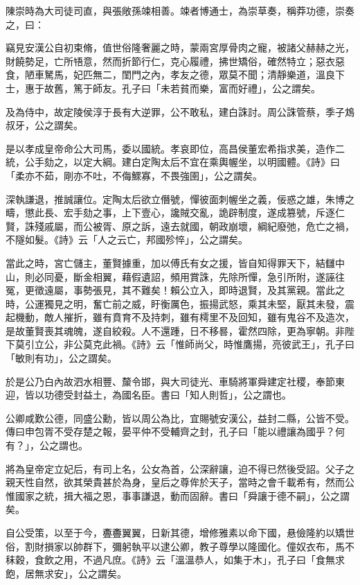\begin{pinyinscope}
陳崇時為大司徒司直，與張敞孫竦相善。竦者博通士，為崇草奏，稱莽功德，崇奏之，曰：

竊見安漢公自初束脩，值世俗隆奢麗之時，蒙兩宮厚骨肉之寵，被諸父赫赫之光，財饒勢足，亡所啎意，然而折節行仁，克心履禮，拂世矯俗，確然特立；惡衣惡食，陋車駑馬，妃匹無二，閨門之內，孝友之德，眾莫不聞；清靜樂道，溫良下士，惠于故舊，篤于師友。孔子曰「未若貧而樂，富而好禮」，公之謂矣。

及為侍中，故定陵侯淳于長有大逆罪，公不敢私，建白誅討。周公誅管蔡，季子鴆叔牙，公之謂矣。

是以孝成皇帝命公大司馬，委以國統。孝哀即位，高昌侯董宏希指求美，造作二統，公手劾之，以定大綱。建白定陶太后不宜在乘輿幄坐，以明國體。《詩》曰「柔亦不茹，剛亦不吐，不侮鰥寡，不畏強圉」，公之謂矣。

深執謙退，推誠讓位。定陶太后欲立僭號，憚彼面刺幄坐之義，佞惑之雄，朱博之疇，懲此長、宏手劾之事，上下壹心，讒賊交亂，詭辟制度，遂成篡號，斥逐仁賢，誅殘戚屬，而公被胥、原之訴，遠去就國，朝政崩壞，綱紀廢弛，危亡之禍，不隧如髮。《詩》云「人之云亡，邦國殄悴」，公之謂矣。

當此之時，宮亡儲主，董賢據重，加以傅氏有女之援，皆自知得罪天下，結讎中山，則必同憂，斷金相翼，藉假遺詔，頻用賞誅，先除所憚，急引所附，遂誣往冤，更徵遠屬，事勢張見，其不難矣！賴公立入，即時退賢，及其黨親。當此之時，公運獨見之明，奮亡前之威，盱衡厲色，振揚武怒，乘其未堅，厭其未發，震起機動，敵人摧折，雖有賁育不及持刺，雖有樗里不及回知，雖有鬼谷不及造次，是故董賢喪其魂魄，遂自絞殺。人不還踵，日不移晷，霍然四除，更為寧朝。非陛下莫引立公，非公莫克此禍。《詩》云「惟師尚父，時惟鷹揚，亮彼武王」，孔子曰「敏則有功」，公之謂矣。

於是公乃白內故泗水相豐、斄令邯，與大司徒光、車騎將軍舜建定社稷，奉節東迎，皆以功德受封益土，為國名臣。書曰「知人則哲」，公之謂也。

公卿咸歎公德，同盛公勳，皆以周公為比，宜賜號安漢公，益封二縣，公皆不受。傳曰申包胥不受存楚之報，晏平仲不受輔齊之封，孔子曰「能以禮讓為國乎？何有？」，公之謂也。

將為皇帝定立妃后，有司上名，公女為首，公深辭讓，迫不得已然後受詔。父子之親天性自然，欲其榮貴甚於為身，皇后之尊侔於天子，當時之會千載希有，然而公惟國家之統，揖大福之恩，事事謙退，動而固辭。書曰「舜讓于德不嗣」，公之謂矣。

自公受策，以至于今，斖斖翼翼，日新其德，增修雅素以命下國，悬儉隆約以矯世俗，割財損家以帥群下，彌躬執平以逮公卿，教子尊學以隆國化。僮奴衣布，馬不秣穀，食飲之用，不過凡庶。《詩》云「溫溫恭人，如集于木」，孔子曰「食無求飽，居無求安」，公之謂矣。


\end{pinyinscope}
